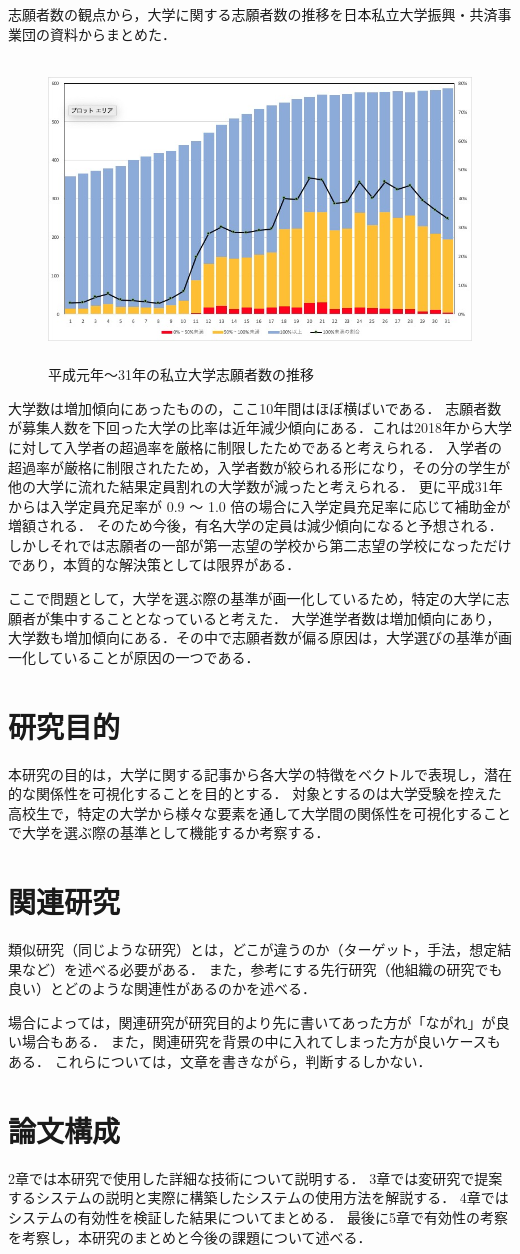 志願者数の観点から，大学に関する志願者数の推移を日本私立大学振興・共済事業団の資料\cite{shigan}からまとめた．
\begin{figure}[H]
\centering
\includegraphics[height=8cm]{images/shigansya.jpg}
\caption{平成元年〜31年の私立大学志願者数の推移}
\label{fig:shigan}
\end{figure}
大学数は増加傾向にあったものの，ここ10年間はほぼ横ばいである．
志願者数が募集人数を下回った大学の比率は近年減少傾向にある．これは2018年から大学に対して入学者の超過率を厳格に制限\cite{hojokin1}したためであると考えられる．
入学者の超過率が厳格に制限されたため，入学者数が絞られる形になり，その分の学生が他の大学に流れた結果定員割れの大学数が減ったと考えられる．
更に平成31年からは入学定員充足率が 0.9 〜 1.0 倍の場合に入学定員充足率に応じて補助金が増額される．\cite{hojokin2}
そのため今後，有名大学の定員は減少傾向になると予想される．
しかしそれでは志願者の一部が第一志望の学校から第二志望の学校になっただけであり，本質的な解決策としては限界がある．

ここで問題として，大学を選ぶ際の基準が画一化しているため，特定の大学に志願者が集中することとなっていると考えた．
大学進学者数は増加傾向にあり，大学数も増加傾向にある．その中で志願者数が偏る原因は，大学選びの基準が画一化していることが原因の一つである．


\section{研究目的}
本研究の目的は，大学に関する記事から各大学の特徴をベクトルで表現し，潜在的な関係性を可視化することを目的とする．
対象とするのは大学受験を控えた高校生で，特定の大学から様々な要素を通して大学間の関係性を可視化することで大学を選ぶ際の基準として機能するか考察する．

\section{関連研究}
類似研究（同じような研究）とは，どこが違うのか（ターゲット，手法，想定結果など）を述べる必要がある．
また，参考にする先行研究（他組織の研究でも良い）とどのような関連性があるのかを述べる．

場合によっては，関連研究が研究目的より先に書いてあった方が「ながれ」が良い場合もある．
また，関連研究を背景の中に入れてしまった方が良いケースもある．
これらについては，文章を書きながら，判断するしかない．

\section{論文構成}
2章では本研究で使用した詳細な技術について説明する．
3章では変研究で提案するシステムの説明と実際に構築したシステムの使用方法を解説する．
4章ではシステムの有効性を検証した結果についてまとめる．
最後に5章で有効性の考察を考察し，本研究のまとめと今後の課題について述べる．